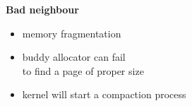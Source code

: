 \documentclass[usenames,dvipsnames, 18pt, compress, aspectratio=169]{beamer}
\begin{document}



\begin{frame}
    \frametitle{}
    \begin{center}
    \textbf{Bad neighbour}

        \begin{itemize}[label={\MVRightarrow}]
            \item memory fragmentation
            \item buddy allocator can fail \\ to find a page of proper size
            \item kernel will start a compaction process
        \end{itemize}

    \end{center}
\end{frame}



\end{document}
